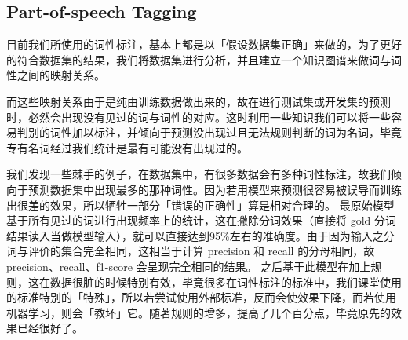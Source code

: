
\subsection{Part-of-speech Tagging}
\label{sec:pos}

目前我们所使用的词性标注，基本上都是以「假设数据集正确」来做的，为了更好的符合数据集的结果，我们将数据集进行分析，并且建立一个知识图谱来做词与词性之间的映射关系。

而这些映射关系由于是纯由训练数据做出来的，故在进行测试集或开发集的预测时，必然会出现没有见过的词与词性的对应。这时利用一些知识我们可以将一些容易判别的词性加以标注，并倾向于预测没出现过且无法规则判断的词为名词，毕竟专有名词经过我们统计是最有可能没有出现过的。

我们发现一些棘手的例子，在数据集中，有很多数据会有多种词性标注，故我们倾向于预测数据集中出现最多的那种词性。因为若用模型来预测很容易被误导而训练出很差的效果，所以牺牲一部分「错误的正确性」算是相对合理的。
最原始模型基于所有见过的词进行出现频率上的统计，这在撇除分词效果（直接将 gold 分词结果读入当做模型输入），就可以直接达到95\%左右的准确度。由于因为输入之分词与评价的集合完全相同，这相当于计算 precision 和 recall 的分母相同，故 precision、recall、f1-score 会呈现完全相同的结果。
之后基于此模型在加上规则，这在数据很脏的时候特别有效，毕竟很多在词性标注的标准中，我们课堂使用的标准特别的「特殊」，所以若尝试使用外部标准，反而会使效果下降，而若使用机器学习，则会「教坏」它。随著规则的增多，提高了几个百分点，毕竟原先的效果已经很好了。
